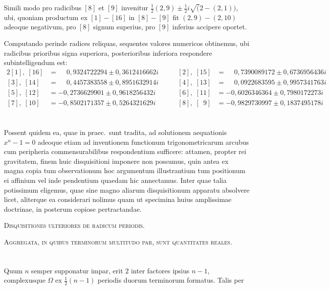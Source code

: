 \documentclass[12pt,a4paper]{article}
\theoremstyle{plain}
\theoremstyle{definition}
\theoremstyle{remark}
\begin{document}
Simili modo pro radicibus $[8]$ et $[9]$ invenitur $\frac{1}{2}(2,9)\pm\frac{1}{2}i\surd(2-(2,1))$, ubi, quoniam productum ex $[1]-[16]$ in $[8]-[9]$ fit $(2,9)-(2,10)$ adeoque negativum, pro $[8]$ signum superius, pro $[9]$ inferius accipere oportet.

Computando perinde radices reliquas, sequentes valores numericos obtinemus, ubi radicibus prioribus signa superiora, posterioribus inferiora respondere subintelligendum est:
\begin{alignat*}{2}
[1],\;[16]&=\phantom{-}0{,}9324722294\pm 0{,}3612416662i\qquad &[2],\;[15]&=\phantom{-}0{,}7390089172\pm 0{,}6736956436i\\
[3],\;[14]&=\phantom{-}0{,}4457383558\pm 0{,}8951632914i &[4],\;[13]&=\phantom{-}0{,}0922683595\pm 0{,}9957341763i\\
[5],\;[12]&=-0{,}2736629901\pm 0{,}9618256432i &[6],\;[11]&=-0{,}6026346364\pm 0{,}7980172273i\\
[7],\;[10]&=-0{,}8502171357\pm 0{,}5264321629i &[8],\;[\phantom{1}9]&=-0{,}9829730997\pm 0{,}1837495178i
\end{alignat*}

\section{}

Possent quidem ea, quae in praec.\ sunt tradita, ad solutionem aequationis $x^n-1=0$ adeoque etiam ad inventionem functionum trigonometricarum arcubus cum peripheria commensurabilibus respondentium sufficere: attamen, propter rei gravitatem, finem huic disquisitioni imponere non possumus, quin antea ex magna copia tum observationum hoc argumentum illustrantium tum positionum ei affinium vel inde pendentium quaedam hic annectamus. Inter quae talia potissimum eligemus, quae sine magno aliarum disquisitionum apparatu absolvere licet, aliterque ea considerari nolimus quam ut specimina huius amplissimae doctrinae, in posterum copiose pertractandae.

\bigskip
\noindent\textsc{Disquisitiones ulteriores de radicum periodis.}

\bigskip
\noindent\textsc{Aggregata, in quibus terminorum multitudo par, sunt quantitates reales.}

\section{}

Quum $n$ semper supponatur impar, erit $2$ inter factores ipsius $n-1$, complexusque $\Omega$ ex $\frac{1}{2}(n-1)$ periodis duorum terminorum formatus. Talis per
\end{document}
